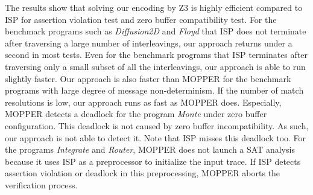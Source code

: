 The results show that solving our encoding by Z3 is highly efficient compared to ISP for assertion violation test and zero buffer compatibility test. For the benchmark programs such as \textit{Diffusion2D} and \textit{Floyd} that ISP does not terminate after traversing a large number of interleavings, our approach returns under a second in most tests. Even for the benchmark programs that ISP terminates after traversing only a small subset of all the interleavings, our approach is able to run slightly faster. Our approach is also faster than MOPPER for the benchmark programs with large degree of message non-determinism. If the number of match resolutions is low, our approach runs as fast as MOPPER does. Especially, MOPPER detects a deadlock for the program \textit{Monte} under zero buffer configuration. This deadlock is not caused by zero buffer incompatibility. As such, our approach is not able to detect it. Note that ISP misses this deadlock too. For the programs \textit{Integrate} and \textit{Router}, MOPPER does not launch a SAT analysis because it uses ISP as a preprocessor to initialize the input trace. If ISP detects assertion violation or deadlock in this preprocessing, MOPPER aborts the verification process. 


